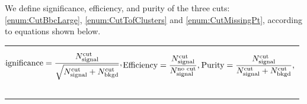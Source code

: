 We define significance, efficiency, and purity of the three cuts: \ref{enum:CutBbcLarge}, \ref{enum:CutTofClusters} and \ref{enum:CutMissingPt}, according to equations shown below.\\[-15pt]%
\begin{tabulary}{\textwidth}{LLL}
\begin{equation}\label{eq:significance}\hspace*{-10pt}
	\text{Significance} = \frac{N_{\text{signal}}^{\text{cut}}}{\sqrt{N_{\text{signal}}^{\text{cut}} + N_{\text{bkgd}}^{\text{cut}}}},
\end{equation}~~~~~~~~~~~~~~~~~&
\begin{equation}\label{eq:efficiency}\hspace*{-10pt}
	\text{Efficiency} = \frac{N_{\text{signal}}^{\text{cut}}}{N_{\text{signal}}^{\text{no~cut}}},
\end{equation}~~~~~~~~~~~~~~&
\begin{equation}\label{eq:purity}\hspace*{-9pt}
	\text{Purity} = \frac{N_{\text{signal}}^{\text{cut}}}{N_{\text{signal}}^{\text{cut}}+N_{\text{bkgd}}^{\text{cut}}},
\end{equation}~~~~~~~~~~~~~~~
\end{tabulary}%
